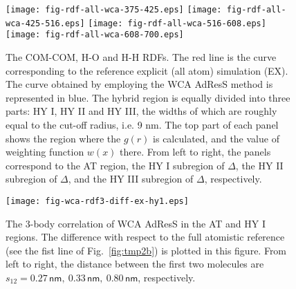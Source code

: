 \documentclass[aip,jcp,a4paper,reprint,onecolumn]{revtex4-1}
\begin{document}
\begin{figure}
  \centering
  \texttt{[image: fig-rdf-all-wca-375-425.eps]}
  \texttt{[image: fig-rdf-all-wca-425-516.eps]}
  \texttt{[image: fig-rdf-all-wca-516-608.eps]}
  \texttt{[image: fig-rdf-all-wca-608-700.eps]}
  \caption{
    The COM-COM, H-O and H-H RDFs. 
    The red line is the curve corresponding to the reference explicit (all atom)
    simulation (EX).
    The curve obtained by employing the WCA AdResS 
    method is represented in blue.
    The hybrid region is equally
    divided into three parts: HY I, HY II and HY III, the widths of
    which are roughly equal to the cut-off radius, i.e. 9 \textsf{nm}.    
    The top part of each panel shows the region where the $g(r)$ is calculated,
    and the value of weighting function $w(x)$ there.
    From left to right, the panels correspond to the AT region, 
    the HY I subregion of $\Delta$,
    the HY II subregion of $\Delta$,
    and the HY III subregion of $\Delta$, respectively. 
  }
  \label{fig:wca-dist}
\end{figure}

\begin{figure}
  \centering
  \texttt{[image: fig-wca-rdf3-diff-ex-hy1.eps]}
  \caption{The 3-body correlation of WCA AdResS in the AT
    and HY I regions.
    The difference with respect to the full atomistic reference
    (see the fist line of Fig.~\ref{fig:tmp2b})
    is plotted in this figure. From left to right, the distance
    between the first two molecules are $s_{12} =
    0.27\,\textsf{nm},\ 0.33\,\textsf{nm},\  
    0.80\,\textsf{nm}$, respectively.
  }
  \label{fig:wca-g3}
\end{figure}
\end{document}
